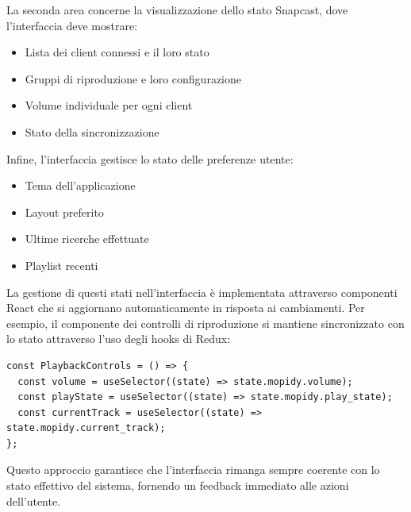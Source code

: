 La seconda area concerne la visualizzazione dello stato Snapcast, dove l'interfaccia deve mostrare:

\begin{itemize}
    \item Lista dei client connessi e il loro stato
    \item Gruppi di riproduzione e loro configurazione
    \item Volume individuale per ogni client
    \item Stato della sincronizzazione
\end{itemize}

Infine, l'interfaccia gestisce lo stato delle preferenze utente:

\begin{itemize}
    \item Tema dell'applicazione
    \item Layout preferito
    \item Ultime ricerche effettuate
    \item Playlist recenti
\end{itemize}

La gestione di questi stati nell'interfaccia è implementata attraverso componenti React che si aggiornano automaticamente in risposta ai cambiamenti. Per esempio, il componente dei controlli di riproduzione si mantiene sincronizzato con lo stato attraverso l'uso degli hooks di Redux:

\begin{table}[H]
  \begin{algorithm}[H]
    \caption{}
    \BlankLine
  \begin{verbatim}
const PlaybackControls = () => {
  const volume = useSelector((state) => state.mopidy.volume);
  const playState = useSelector((state) => state.mopidy.play_state);
  const currentTrack = useSelector((state) => state.mopidy.current_track);
};
      \end{verbatim}
    \end{algorithm}
    \caption{}
    \label{tab:playbackcontrols}
  \end{table}

Questo approccio garantisce che l'interfaccia rimanga sempre coerente con lo stato effettivo del sistema, fornendo un feedback immediato alle azioni dell'utente.

